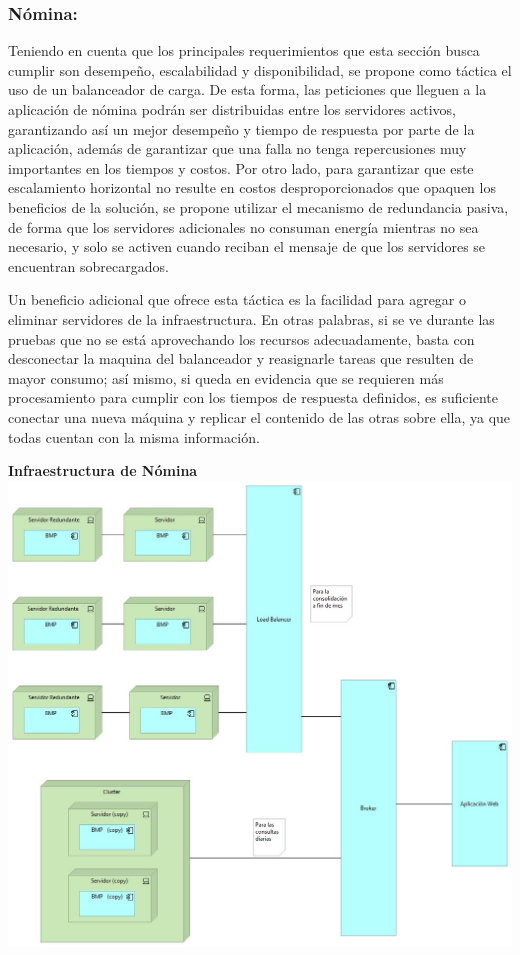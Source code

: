 \documentclass[a4paper]{article}
\begin{document}
\subsubsection{Nómina:}
Teniendo en cuenta que los principales requerimientos que esta sección busca cumplir son desempeño, escalabilidad y disponibilidad, se propone como táctica el uso de un balanceador de carga. De esta forma, las peticiones que lleguen a la aplicación de nómina podrán ser distribuidas entre los servidores activos, garantizando así un mejor desempeño y tiempo de respuesta por parte de la aplicación, además de garantizar que una falla no tenga repercusiones muy importantes en los tiempos y costos. Por otro lado, para garantizar que este escalamiento horizontal no resulte en costos desproporcionados que opaquen los beneficios de la solución, se propone utilizar el mecanismo de redundancia pasiva, de forma que los servidores adicionales no consuman energía mientras no sea necesario, y solo se activen cuando reciban el mensaje de que los servidores se encuentran sobrecargados. 

Un beneficio adicional que ofrece esta táctica es la facilidad para agregar o eliminar servidores de la infraestructura. En otras palabras, si se ve durante las pruebas que no se está aprovechando los recursos adecuadamente, basta con desconectar la maquina del balanceador y reasignarle tareas que resulten de mayor consumo; así mismo, si queda en evidencia que se requieren más procesamiento para cumplir con los tiempos de respuesta definidos, es suficiente conectar una nueva máquina y replicar el contenido de las otras sobre ella, ya que todas cuentan con la misma información.
\begin{center}
    \textbf{Infraestructura de Nómina}
    \includegraphics[scale=0.45]{nomina.jpeg}
\end{center}
\end{document}
